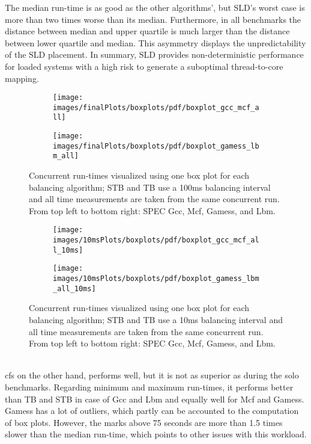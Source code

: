 The median run-time is as good as the other algorithms', but SLD's worst case
is more than two times worse than its median.
Furthermore, in all benchmarks the distance between median and upper quartile
is much larger than the distance between lower quartile and median.
This asymmetry displays the unpredictability of the SLD placement.
In summary, SLD provides non-deterministic performance for loaded systems with a
high risk to generate a suboptimal thread-to-core mapping.
%
\begin{figure}[h!]
  \begin{subfigure}{\textwidth}
  \texttt{[image: images/finalPlots/boxplots/pdf/boxplot\_gcc\_mcf\_all]}
  \end{subfigure}
  \begin{subfigure}{\textwidth}
  \texttt{[image: images/finalPlots/boxplots/pdf/boxplot\_gamess\_lbm\_all]}
  \end{subfigure}
  \caption{Concurrent run-times visualized using one box plot for each balancing
    algorithm; STB and TB use a 100ms balancing interval and all time
    measurements are taken from the same concurrent run.
    From top left to bottom right: SPEC Gcc, Mcf, Gamess, and Lbm.
    }
    \label{eval:fig:box_all}
\end{figure}
%
\begin{figure}[!ht]
  \begin{subfigure}{\textwidth}
  \texttt{[image: images/10msPlots/boxplots/pdf/boxplot\_gcc\_mcf\_all\_10ms]}
  \end{subfigure}
  \begin{subfigure}{\textwidth}
  \texttt{[image: images/10msPlots/boxplots/pdf/boxplot\_gamess\_lbm\_all\_10ms]}
  \end{subfigure}
  \caption{Concurrent run-times visualized using one box plot for each balancing
    algorithm; STB and TB use a 10ms balancing interval and all time
    measurements are taken from the same concurrent run.
    From top left to bottom right: SPEC Gcc, Mcf, Gamess, and Lbm.
    }
  \label{eval:fig:box_all_10ms}
\end{figure}
\\


\Gls{cfs} on the other hand, performs well, but it is not as superior as during
the solo benchmarks.
Regarding minimum and maximum run-times, it performs better than TB and STB in
case of Gcc and Lbm and equally well for Mcf and Gamess.
Gamess has a lot of outliers, which partly can be accounted to the computation
of box plots.
However, the marks above 75 seconds are more than 1.5 times slower than the
median run-time, which points to other issues with this workload.

